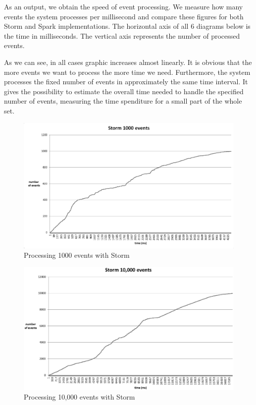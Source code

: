 As an output, we obtain the speed of event processing.
We measure how many events the system processes per millisecond and compare these figures for both Storm and Spark implementations.
The horizontal axis of all 6 diagrams below is the time in milliseconds.
The vertical axis represents the number of processed events.

As we can see, in all cases graphic increases almost linearly.
It is obvious that the more events we want to process the more time we need.
Furthermore, the system processes the fixed number of events in approximately the same time interval.
It gives the possibility to estimate the overall time needed to handle the specified number of events, measuring the time spenditure for a small part of the whole set.

\begin{figure}
  \centering
  \includegraphics [width=1.1\textwidth]{images/storm1000}
  \caption{Processing 1000 events with Storm}
  \label{fig:storm1000}
\end{figure}

\begin{figure}
  \centering
  \includegraphics [width=1.1\textwidth]{images/storm10000}
  \caption{Processing 10,000 events with Storm}
  \label{fig:storm10000}
\end{figure}

